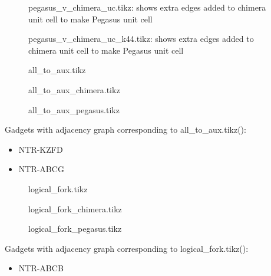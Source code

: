 \documentclass{article}
\begin{document}
\begin{figure}

\caption{pegasus\_v\_chimera\_uc.tikz: shows extra edges added to chimera unit cell to make Pegasus unit cell}
\end{figure}

\begin{figure}

\caption{pegasus\_v\_chimera\_uc\_k44.tikz: shows extra edges added to chimera unit cell to make Pegasus unit cell}
\end{figure}


\begin{figure}

\caption{all\_to\_aux.tikz}
\end{figure}

\begin{figure}

\caption{all\_to\_aux\_chimera.tikz}
\end{figure}

\begin{figure}

\caption{all\_to\_aux\_pegasus.tikz}
\end{figure}

Gadgets with adjacency graph corresponding to all\_to\_aux.tikz(\scalebox{.25}{}):

\begin{itemize}
\item NTR-KZFD
\item NTR-ABCG
\end{itemize}

\begin{figure}

\caption{logical\_fork.tikz}
\end{figure}

\begin{figure}

\caption{logical\_fork\_chimera.tikz}
\end{figure}

\begin{figure}

\caption{logical\_fork\_pegasus.tikz}
\end{figure}

Gadgets with adjacency graph corresponding to logical\_fork.tikz(\scalebox{.25}{}):

\begin{itemize}
\item NTR-ABCB
\end{itemize}
\end{document}
